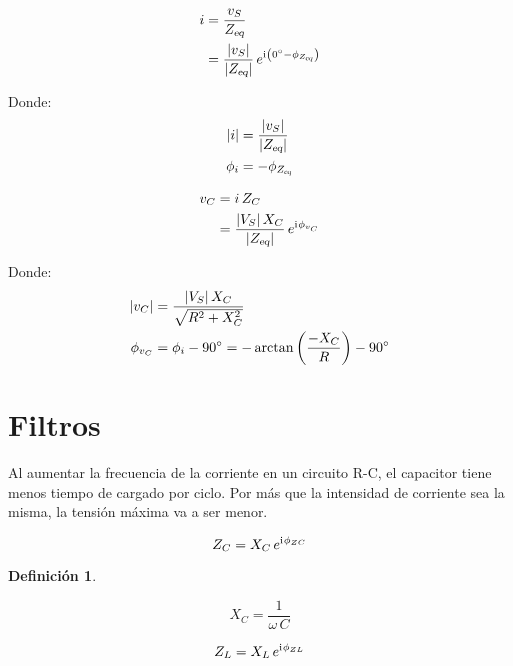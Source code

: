 \documentclass[a5paper,12pt,twoside]{book}
\newtheorem{defn}{{Definición}}[chapter]
\begin{document}
\begin{align*}
    i &= \frac{v_S}{{{Z}_\textsl{{eq}}}}
    \\
    &= \frac{{\left| {v_S} \right|}}{{\left| {{{Z}_\textsl{{eq}}}} \right|}} \, e^{\mathrm{i}\mkern1mu \left(\ang{0} - \phi_{{{Z}_\textsl{{eq}}}}\right)}
\end{align*}

Donde:
\begin{align*}
    {\left| {i} \right|} &= \frac{{\left| {v_S} \right|}}{{\left| {{{Z}_\textsl{{eq}}}} \right|}}
    \\
    \phi_i &= - \phi_{{{Z}_\textsl{{eq}}}}
\end{align*}

\begin{align*}
    v_C &= i \, Z_C
    \\
    &= \frac{{\left| {V_S} \right|} \, X_C}{{\left| {{{Z}_\textsl{{eq}}}} \right|}} \, e^{\mathrm{i}\mkern1mu \phi_{v_C}}
\end{align*}

Donde:
\begin{align*}
    {\left| {v_C} \right|} &= \frac{{\left| {V_S} \right|} \, X_C}{\sqrt{R^2 + X_C^2}}
    \\
    \phi_{v_C} &= \phi_i - \ang{90} = - \arctan{\left(\dfrac{-X_C}{R} \right)} - \ang{90}
\end{align*}




\section{Filtros}

Al aumentar la frecuencia de la corriente en un circuito R-C, el capacitor tiene menos tiempo de cargado por ciclo. Por más que la intensidad de corriente sea la misma, la tensión máxima va a ser menor.

\begin{equation*}
    Z_C = X_C \, e^{\mathrm{i}\mkern1mu \phi_{ZC}}
\end{equation*}

\begin{mdframed}[style=MyFrame1]
    \begin{defn}
    \end{defn}
    \begin{equation*}
        X_C = \frac{1}{\omega \, C}
    \end{equation*}
\end{mdframed}

\begin{equation*}
    Z_L = X_L \, e^{\mathrm{i}\mkern1mu \phi_{ZL}}
\end{equation*}
\end{document}

